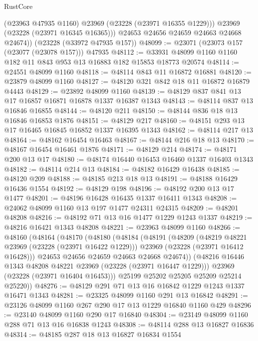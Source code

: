 \begin{lexlean}{RustCore}
\begin{coremodule}
            (@23963 @47935 @1160)
            @23969
            (@23228 (@23971 @16355 @1229)))
          @23969
          (@23228 (@23971 @16345 @16365)))
        @24653
        @24656
        @24659
        @24663
        @24668
        @24674))
    (@23228 (@33972 @47935 @157))
@48099 := @23071 (@23073 @157 (@23077 (@23078 @157))) @47935
@48112 := @33931 @48099 @1160 @1160 @182 @11 @843 @953 @13 @16883 @182 @15853 @18773 @20574
@48114 := @24551 @48099 @1160
@48118 := @48114 @843 @11 @16872 @16881
@48120 := @23879 @48099 @1160
@48127 := @48120 @321 @842 @18 @11 @16872 @16879 @4443
@48129 := @23892 @48099 @1160
@48139 := @48129 @837 @841 @13 @17 @16857 @16871 @16878 @1337 @16387 @1343
@48143 := @48114 @837 @13 @16846 @16855
@48144 := @48120 @211
@48150 := @48144 @836 @18 @13 @16846 @16853 @1876
@48151 := @48129 @217
@48160 := @48151 @293 @13 @17 @16465 @16845 @16852 @1337 @16395 @1343
@48162 := @48114 @217 @13
@48164 := @48162 @16454 @16463
@48167 := @48144 @216 @18 @13
@48170 := @48167 @16454 @16461 @1876
@48171 := @48129 @214
@48174 := @48171 @200 @13 @17
@48180 := @48174 @16440 @16453 @16460 @1337 @16403 @1343
@48182 := @48114 @214 @13
@48184 := @48182 @16429 @16438
@48185 := @48120 @209
@48188 := @48185 @213 @18 @13
@48191 := @48188 @16429 @16436 @1554
@48192 := @48129 @198
@48196 := @48192 @200 @13 @17 @1477
@48201 := @48196 @16428 @16435 @1337 @16411 @1343
@48208 := @24062 @48099 @1160 @13 @197 @1477 @24311 @24315
@48209 := @48201 @48208
@48216 := @48192 @71 @13 @16 @1477 @1229 @1243 @1337
@48219 := @48216 @16421 @1343 @48208
@48221 := @23963 @48099 @1160
@48266 := @48160
    (@48164
      (@48170
        (@48180
          (@48184
            (@48191
              (@48209
                (@48219 @48221 @23969 (@23228 (@23971 @16422 @1229)))
                @23969
                (@23228 (@23971 @16412 @16428)))
              @24653
              @24656
              @24659
              @24663
              @24668
              @24674))
          (@48216 @16446 @1343 @48208 @48221 @23969 (@23228 (@23971 @16447 @1229)))
          @23969
          (@23228 (@23971 @16404 @16453)))
        @25199
        @25202
        @25205
        @25209
        @25214
        @25220))
@48276 := @48129 @291 @71 @13 @16 @16842 @1229 @1243 @1337 @16471 @1343
@48281 := @23325 @48099 @1160 @291 @13 @16842
@48291 := @23126 @48099 @1160 @267 @290 @17 @13 @1229 @16840 @1160 @429
@48296 := @23140 @48099 @1160 @290 @17 @16840
@48304 := @23149 @48099 @1160 @288 @71 @13 @16 @16838 @1243
@48308 := @48114 @288 @13 @16827 @16836
@48314 := @48185 @287 @18 @13 @16827 @16834 @1554

\end{coremodule}
\end{lexlean}
